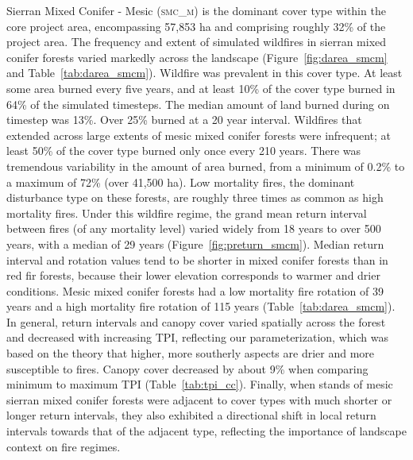 Sierran Mixed Conifer - Mesic (\textsc{smc\_m}) is the dominant cover type within the core project area, encompassing 57,853 ha and comprising roughly 32\% of the project area. The frequency and extent of simulated wildfires in sierran mixed conifer forests varied markedly across the landscape (Figure~\ref{fig:darea_smcm} and Table~\ref{tab:darea_smcm}). %
%
Wildfire was prevalent in this cover type. At least some area burned every five years, and at least 10\% of the cover type burned in 64\% of the simulated timesteps. The median amount of land burned during on timestep was 13\%. Over 25\% burned at a 20 year interval. Wildfires that extended across large extents of mesic mixed conifer forests were infrequent; at least 50\% of the cover type burned only once every 210 years. There was tremendous variability in the amount of area burned, from a minimum of 0.2\% to a maximum of 72\% (over 41,500 ha). Low mortality fires, the dominant disturbance type on these forests, are roughly three times as common as high mortality fires. %
%
Under this wildfire regime, the grand mean return interval between fires (of any mortality level) varied widely from 18 years to over 500 years, with a median of 29 years (Figure~\ref{fig:preturn_smcm}). Median return interval and rotation values tend to be shorter in mixed conifer forests than in red fir forests, because their lower elevation corresponds to warmer and drier conditions. Mesic mixed conifer forests had a low mortality fire rotation of 39 years and a high mortality fire rotation of 115 years (Table~\ref{tab:darea_smcm}).  %
%
In general, return intervals and canopy cover varied spatially across the forest and decreased with increasing TPI, reflecting our parameterization, which was based on the theory that higher, more southerly aspects are drier and more susceptible to fires. Canopy cover decreased by about 9\% when comparing minimum to maximum TPI (Table~\ref{tab:tpi_cc}).  %
%
Finally, when stands of mesic sierran mixed conifer forests were adjacent to cover types with much shorter or longer return intervals, they also exhibited a directional shift in local return intervals towards that of the adjacent type, reflecting the importance of landscape context on fire regimes.

